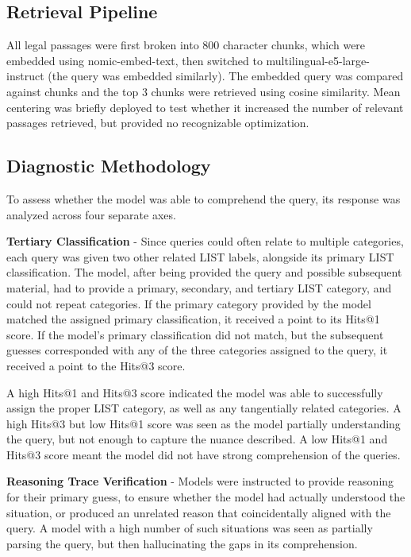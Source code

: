 \documentclass[11pt]{article}
\begin{document}
\subsection{Retrieval Pipeline}
All legal passages were first broken into 800 character chunks, which were embedded using nomic-embed-text, then switched to multilingual-e5-large-instruct (the query was embedded similarly). The embedded query was compared against chunks and the top 3 chunks were retrieved using cosine similarity. Mean centering was briefly deployed to test whether it increased the number of relevant passages retrieved, but provided no recognizable optimization. 

\subsection{Diagnostic Methodology}
To assess whether the model was able to comprehend the query, its response was analyzed across four separate axes. %

\textbf{Tertiary Classification} - Since queries could often relate to multiple categories, each query was given two other related LIST labels, alongside its primary LIST classification. The model, after being provided the query and possible subsequent material, had to provide a primary, secondary, and tertiary LIST category, and could not repeat categories. If the primary category provided by the model matched the assigned primary classification, it received a point to its Hits@1 score. If the model's primary classification did not match, but the subsequent guesses corresponded with any of the three categories assigned to the query, it received a point to the Hits@3 score. 

A high Hits@1 and Hits@3 score indicated the model was able to successfully assign the proper LIST category, as well as any tangentially related categories. A high Hits@3 but low Hits@1 score was seen as the model partially understanding the query, but not enough to capture the nuance described. A low Hits@1 and Hits@3 score meant the model did not have strong comprehension of the queries. 

\textbf{Reasoning Trace Verification} - Models were instructed to provide reasoning for their primary guess, to ensure whether the model had actually understood the situation, or produced an unrelated reason that coincidentally aligned with the query. A model with a high number of such situations was seen as partially parsing the query, but then hallucinating the gaps in its comprehension. 
\end{document}
